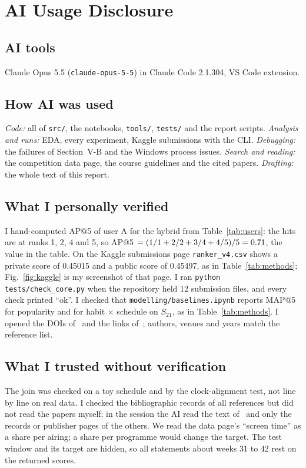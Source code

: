 \documentclass[conference]{IEEEtran}
\begin{document}
\section{AI Usage Disclosure}
\subsection{AI tools}
Claude Opus 5.5 (\texttt{claude-opus-5-5}) in Claude Code 2.1.304, VS Code extension.

\subsection{How AI was used}
\emph{Code:} all of \texttt{src/}, the notebooks, \texttt{tools/}, \texttt{tests/} and the report scripts. \emph{Analysis and runs:} EDA, every experiment, Kaggle submissions with the CLI. \emph{Debugging:} the failures of Section~V-B and the Windows process issues. \emph{Search and reading:} the competition data page, the course guidelines and the cited papers. \emph{Drafting:} the whole text of this report.

\subsection{What I personally verified}
I hand-computed AP@5 of user A for the hybrid from Table~\ref{tab:users}: the hits are at ranks 1, 2, 4 and 5, so AP@5 $=(1/1+2/2+3/4+4/5)/5=0.71$, the value in the table. On the Kaggle submissions page \texttt{ranker\_v4.csv} shows a private score of 0.45015 and a public score of 0.45497, as in Table~\ref{tab:methods}; Fig.~\ref{fig:kaggle} is my screenshot of that page. I ran \texttt{python tests/check\_core.py} when the repository held 12 submission files, and every check printed ``ok''. I checked that \texttt{modelling/baselines.ipynb} reports MAP@5 \mapPop{} for popularity and \mapHS{} for habit $\times$ schedule on $S_{21}$, as in Table~\ref{tab:methods}. I opened the DOIs of~\cite{hu2008,jeh2003,agrawal1993,covington2016,cormack2009} and the links of~\cite{ke2017,burges2010,kaggle}; authors, venues and years match the reference list.

\subsection{What I trusted without verification}
The join was checked on a toy schedule and by the clock-alignment test, not line by line on real data. I checked the bibliographic records of all references but did not read the papers myself; in the session the AI read the text of~\cite{hu2008,cormack2009,covington2016} and only the records or publisher pages of the others. We read the data page's ``screen time'' as a share per airing; a share per programme would change the target. The test window and its target are hidden, so all statements about weeks 31 to 42 rest on the returned scores.
\end{document}
